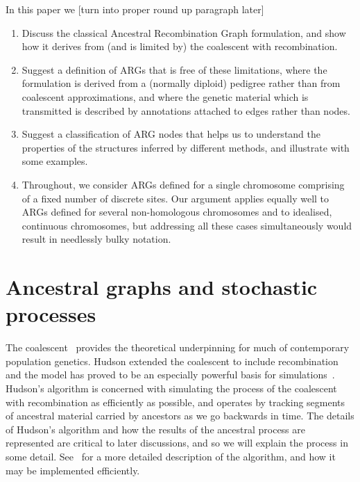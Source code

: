 \documentclass{article}
\begin{document}
In this paper we [turn into proper round up paragraph later]
\begin{enumerate}
\item Discuss the classical Ancestral Recombination Graph formulation,
and show how it derives from (and is limited by) the coalescent with
recombination.
\item Suggest a definition of ARGs that is free of these limitations,
where the formulation is derived from a (normally diploid) pedigree rather than from
coalescent approximations, and where the genetic
material which is transmitted is described by annotations attached to
edges rather than nodes.
\item Suggest a classification of ARG nodes that helps us to understand
the properties of the structures inferred by different methods, and illustrate
with some examples.
\item Throughout, we consider ARGs defined for a single chromosome comprising
of a fixed number of discrete sites. Our argument applies equally well to ARGs
defined for several non-homologous chromosomes \citep{fearnhead2003ancestral,
koskela2019robust} and to idealised, continuous chromosomes, but addressing
all these cases simultaneously would result in needlessly bulky notation.
\end{enumerate}

\section*{Ancestral graphs and stochastic processes}
The coalescent~\citep{kingman1982coalescent,kingman1982genealogy,
hudson1983testing, tajima1983evolutionary}
provides the theoretical underpinning for much of contemporary population genetics.
Hudson extended the coalescent to include
recombination~\citep{hudson1983properties,hudson1990gene}
and the model has proved to be an especially powerful basis for
simulations~\citep{hudson2002generating,baumdicker2021efficient}.
Hudson's algorithm is concerned with simulating the process of
the coalescent with recombination as efficiently as possible, and operates by
tracking segments of ancestral material carried by ancestors as
we go backwards in time. The details of Hudson's algorithm and how the
results of the ancestral process are represented are critical to later
discussions, and so we will explain the process in some detail.
See~\cite{kelleher2016efficient} for a more detailed
description of the algorithm, and how it may be implemented efficiently.
\end{document}

